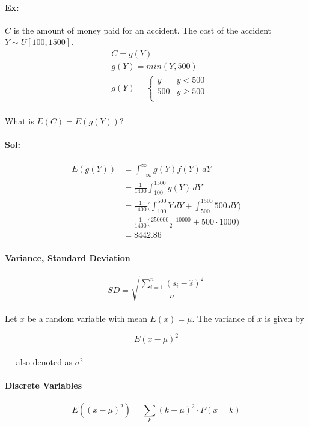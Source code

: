 \documentclass[letterpaper,12pt]{article}
\begin{document}
\paragraph{Ex:}$C$ is the amount of money paid for an accident. The cost of the accident $Y \sim U[100,1500]$.
\begin{align*}
    &C = g(Y)\\
    &g(Y) = min(Y, 500)\\
    &g(Y) = \begin{cases}
        y & y < 500\\
        500 & y \ge 500 \\
        \end{cases}
\end{align*}
\paragraph{}What is $E(C) = E(g(Y))$?
\paragraph{Sol:}
\begin{align*}
    E(g(Y)) &= \int_{-\infty}^{\infty}g(Y)f(Y)\,dY\\
            &= \frac{1}{1400} \int_{100}^{1500} g(Y)\,dY\\
            &= \frac{1}{1400} \bigg( \int_{100}^{500} Y\,dY + \int_{500}^{1500}500\,dY\bigg)\\
            &= \frac{1}{1400} \bigg( \frac{250000-10000}{2} + 500\cdot 1000\bigg)\\
            &= \$442.86
\end{align*}
\paragraph{Variance, Standard Deviation}
\[
    SD = \sqrt{\frac{\displaystyle\sum_{i=1}^n (s_i - \hat{s})^2}{n}}
\]
\paragraph{}Let $x$ be a random variable with mean $E(x) = \mu$. The variance of $x$ is given by

\[
    E(x-\mu)^2
\]
\paragraph{}--- also denoted as $\sigma^2$
\paragraph{Discrete Variables}
\[
    E((x-\mu)^2) = \sum_k (k-\mu)^2 \cdot P(x=k)
\]
\end{document}
